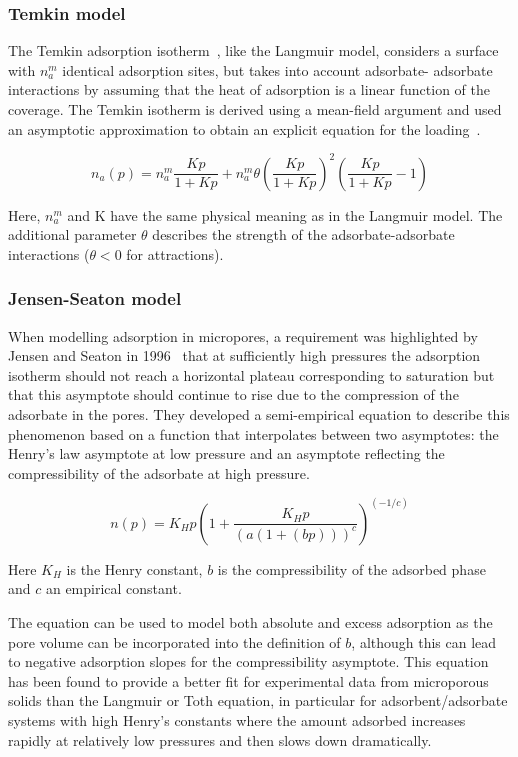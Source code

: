 \subsubsection{Temkin model}

The Temkin adsorption isotherm~\cite{temkinKineticsAmmoniaSynthesis1940}, 
like the Langmuir model, considers
a surface with \(n_a^m\) identical adsorption sites, but takes into account adsorbate-
adsorbate interactions by assuming that the heat of adsorption is a linear
function of the coverage. The Temkin isotherm is derived using a
mean-field argument and used an asymptotic approximation
to obtain an explicit equation for the 
loading~\cite{simonOptimizingNanoporousMaterials2014}.

\begin{equation}\label{eqn:pyg:temkin}
    n_a(p) = n_a^m \frac{Kp}{1+Kp} + n_a^m \theta (\frac{Kp}{1+Kp})^2 (\frac{Kp}{1+Kp} -1)
\end{equation}

Here, \(n_a^m\) and K have the same physical meaning as in the Langmuir model.
The additional parameter \(\theta\) describes the strength of the adsorbate-adsorbate
interactions (\(\theta < 0\) for attractions).

\subsubsection{Jensen-Seaton model}

When modelling adsorption in micropores, a requirement was highlighted by
Jensen and Seaton in 1996~\cite{jensenIsothermEquationAdsorption1996} 
that at sufficiently high pressures the adsorption
isotherm should not reach a horizontal plateau corresponding to saturation but
that this asymptote should continue to rise due to the compression 
of the adsorbate in the pores. They developed a semi-empirical equation
to describe this phenomenon based on a function that interpolates between
two asymptotes: the Henry’s law asymptote at low pressure and an
asymptote reflecting the compressibility of the adsorbate at
high pressure.

\begin{equation}\label{eqn:pyg:jseaton}
    n(p) = K_H p (1 + \frac{K_H p}{(a (1+(b p)))^c})^{(-1/c)}
\end{equation}

Here \(K_H\) is the Henry constant, \(b\) is the compressibility of the
adsorbed phase and \(c\) an empirical constant.

The equation can be used to model both absolute and excess adsorption as the pore
volume can be incorporated into the definition of \(b\), although this can lead
to negative adsorption slopes for the compressibility asymptote.
This equation has been found to provide a better fit for experimental data
from microporous solids than the Langmuir or Toth equation, in particular for
adsorbent/adsorbate systems with high Henry’s constants where the amount adsorbed
increases rapidly at relatively low pressures and then slows down dramatically.

